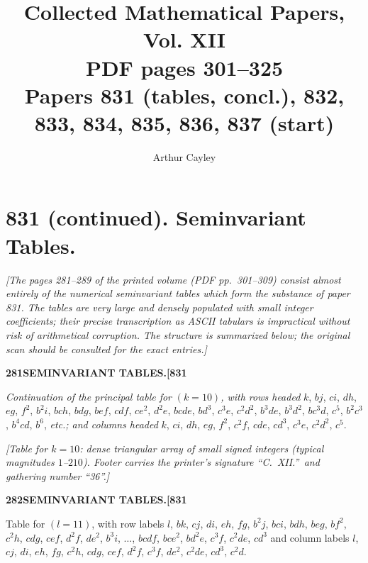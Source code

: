 \documentclass[11pt]{article}
\title{Collected Mathematical Papers, Vol. XII\\ \large PDF pages 301--325\\ Papers 831 (tables, concl.), 832, 833, 834, 835, 836, 837 (start)}
\author{Arthur Cayley}
\date{}
\begin{document}
\maketitle


\section*{831 (continued). Seminvariant Tables.}

\medskip

\noindent\textit{[The pages 281--289 of the printed volume (PDF pp.\ 301--309) consist almost entirely of the numerical seminvariant tables which form the substance of paper 831. The tables are very large and densely populated with small integer coefficients; their precise transcription as ASCII tabulars is impractical without risk of arithmetical corruption. The structure is summarized below; the original scan should be consulted for the exact entries.]}

\medskip

\noindent\textbf{281}\hfill\textbf{SEMINVARIANT TABLES.}\hfill\textbf{[831}

\bigskip

\noindent \emph{Continuation of the principal table for} $(k = 10)$\emph{, with rows headed}
$k$, $bj$, $ci$, $dh$, $eg$, $f^{2}$, $b^{2}i$, $bch$, $bdg$, $bef$, $cdf$, $ce^{2}$, $d^{2}e$, $bcde$, $bd^{3}$, $c^{3}e$, $c^{2}d^{2}$, $b^{3}de$, $b^{3}d^{2}$, $bc^{3}d$, $c^{5}$, $b^{2}c^{3}$, $b^{4}cd$, $b^{6}$, \emph{etc.; and columns headed}
$k$, $ci$, $dh$, $eg$, $f^{2}$, $c^{2}f$, $cde$, $cd^{3}$, $c^{3}e$, $c^{2}d^{2}$, $c^{5}$.

\medskip

\noindent\textit{[Table for $k=10$: dense triangular array of small signed integers (typical magnitudes $1$--$210$). Footer carries the printer's signature ``C.\ XII.''\ and gathering number ``36''.]}

\bigskip

\newpage

\noindent\textbf{282}\hfill\textbf{SEMINVARIANT TABLES.}\hfill\textbf{[831}

\bigskip

\noindent Table for $(l = 11)$, with row labels
$l$, $bk$, $cj$, $di$, $eh$, $fg$, $b^{2}j$, $bci$, $bdh$, $beg$, $bf^{2}$, $c^{2}h$, $cdg$, $cef$, $d^{2}f$, $de^{2}$, $b^{3}i$, $\ldots$, $bcdf$, $bce^{2}$, $bd^{2}e$, $c^{3}f$, $c^{2}de$, $cd^{3}$
and column labels $l$, $cj$, $di$, $eh$, $fg$, $c^{2}h$, $cdg$, $cef$, $d^{2}f$, $c^{3}f$, $de^{2}$, $c^{2}de$, $cd^{3}$, $c^{2}d$.
\end{document}
